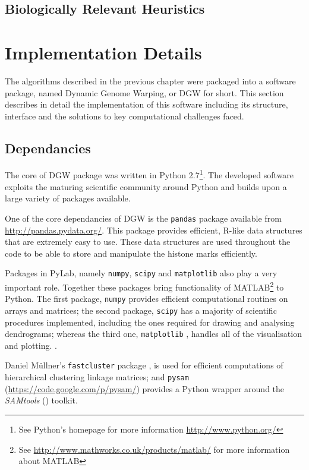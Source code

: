 \documentclass[parskip]{cs4rep}
\newcommand{\pythonpackage}[1]{{\tt #1}}
\begin{document}
\section{Biologically Relevant Heuristics}

\chapter{Implementation Details}
The algorithms described in the previous chapter were packaged into a software package, named Dynamic Genome Warping, or DGW for short. This section describes in detail the implementation of this software including its structure, interface and the solutions to key computational challenges faced.

\section{Dependancies}
The core of DGW package was written in Python 2.7\footnote{See Python's homepage for more information \url{http://www.python.org/}}. The developed software exploits the maturing scientific community around Python and builds upon a large variety of packages available.

One of the core dependancies of DGW is the \verb"pandas" package available from \url{http://pandas.pydata.org/}. This package provides efficient, R-like data structures that are extremely easy to use. These data structures are used throughout the code to be able to store and manipulate the histone marks efficiently. 

Packages in PyLab, namely \pythonpackage{numpy}, \pythonpackage{scipy} and \pythonpackage{matplotlib} also play a very important role. Together these packages bring functionality of MATLAB\footnote{See \url{http://www.mathworks.co.uk/products/matlab/} for more information about MATLAB} to Python. The first package, \pythonpackage{numpy} provides efficient computational routines on arrays and matrices; the second package, \pythonpackage{scipy} has a majority of scientific procedures implemented, including the ones required for drawing and analysing dendrograms; whereas the third one, \pythonpackage{matplotlib} \cite{Hunter:2007ux}, handles all of the visualisation and plotting. .

Daniel M\"ullner's \pythonpackage{fastcluster} package \cite{Mullner:2011wb}, is used for efficient computations
of hierarchical clustering linkage matrices; and \pythonpackage{pysam} (\url{https://code.google.com/p/pysam/}) provides a Python wrapper around the \emph{SAMtools} (\cite{Li:2009ka}) toolkit.
\end{document}
